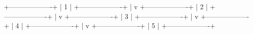 +-------------------+
       |        1           |
       +-------------------+
              |
              v
       +-------------------+
       |        2           |
       +-------------------+
              |
              v
       +-------------------+
       |        3           |
       +-------------------+
              |
              v
       +-------------------+
       |        4           |
       +-------------------+
              |
              v
       +-------------------+
       |        5           |
       +-------------------+